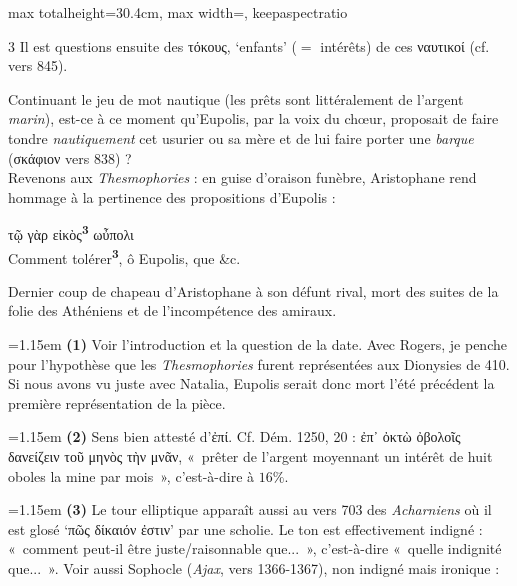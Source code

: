 \documentclass[11pt,twoside]{book}
\newcommand{\italique}[1]{\textit{#1}}
\newcommand{\citComm}[1]{\begin{quoting}[vskip=0.4pt,leftmargin=0.7em,rightmargin=0.2em]#1\end{quoting}}
\newcommand{\marqueur}[1]{\textsuperscript{\color{rubricRed}\textbf{#1}}}
\begin{document}
\begin{adjustbox}{max totalheight=30.4cm, max width=\textwidth, keepaspectratio}
\begin{minipage}{\textwidth}
{\begin{multicols}{3}
\noindent Il est questions ensuite des τόκους, `enfants' ($=$ intérêts) de ces ναυτικοί (cf. vers 845).
\par\vspace{1.5pt}
\noindent Continuant le jeu de mot nautique (les prêts sont littéralement de l'argent \italique{marin}), est-ce à ce moment qu'Eupolis, par la voix du chœur, proposait de faire tondre \italique{nautiquement} cet usurier ou sa mère et de lui faire porter une \italique{barque} (σκάφιον vers 838) ?\\ Revenons aux \italique{Thesmophories} : en guise d'oraison funèbre, Aristophane rend hommage à la pertinence des propositions d'Eupolis :
\citComm{τῷ γὰρ εἰκὸς\marqueur{3} ωὖπολι\\
Comment tolérer\marqueur{3}, ô Eupolis, que \&c.}
\par\vspace{1.5pt}
\noindent Dernier coup de chapeau d'Aristophane à son défunt rival, mort des suites de la folie des Athéniens et de l'incompétence des amiraux.
\par\vspace{1.5pt}
\par\vspace{1.2pt}\par\nopagebreak\vspace{1pt}\noindent\hangindent=1.15em {\color{sepiaNote}\textbf{(1)}} Voir l'introduction et la question de la date. Avec Rogers, je penche pour l'hypothèse que les \italique{Thesmophories} furent représentées aux Dionysies de 410. Si nous avons vu juste avec Natalia, Eupolis serait donc mort l'été précédent la première représentation de la pièce.
\par\vspace{1.5pt}
\noindent\hangindent=1.15em {\color{sepiaNote}\textbf{(2)}} Sens bien attesté d'ἐπί. Cf. Dém. 1250, 20 : ἐπ᾽ ὀκτὼ ὀβολοῖς δανείζειν τοῦ μηνὸς τὴν μνᾶν, «~prêter de l'argent moyennant un intérêt de huit oboles la mine par mois~», c'est-à-dire à $16 \%$.
\par\vspace{1.5pt}
\noindent\hangindent=1.15em {\color{sepiaNote}\textbf{(3)}} Le tour elliptique apparaît aussi au vers 703 des \italique{Acharniens} où il est glosé `πῶς δίκαιόν ἐστιν' par une scholie. Le ton est effectivement indigné : «~comment peut-il être juste/raisonnable que...~», c'est-à-dire «~quelle indignité que...~». Voir aussi Sophocle (\italique{Ajax}, vers 1366-1367), non indigné mais ironique :

\end{multicols}}
\end{minipage}
\end{adjustbox}
\end{document}

